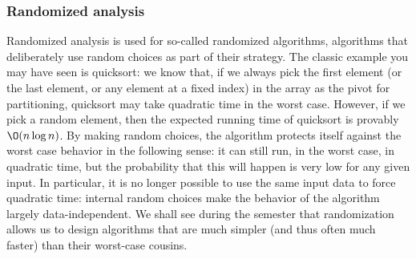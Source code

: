 \documentclass{article}
\begin{document}
\subsubsection{Randomized analysis}
Randomized analysis is used for so-called randomized algorithms, algorithms
that deliberately use random choices as part of their strategy.  The classic
example you may have seen is quicksort: we know that, if we always pick
the first element (or the last element, or any element at a fixed index)
in the array as the pivot for partitioning, quicksort may take quadratic
time in the worst case.  However, if we pick a random element, then the
expected running time of quicksort is provably $\O(n\log n)$.   By making
random choices, the algorithm protects itself against the worst case
behavior in the following sense: it can still run, in the worst case,
in quadratic time, but the probability that this will happen is very low
for any given input.  In particular, it is no longer possible to use the
same input data to force quadratic time: internal random choices make
the behavior of the algorithm largely data-independent.  We shall see
during the semester that randomization allows us to design algorithms
that are much simpler (and thus often much faster) than their worst-case
cousins.
\end{document}

